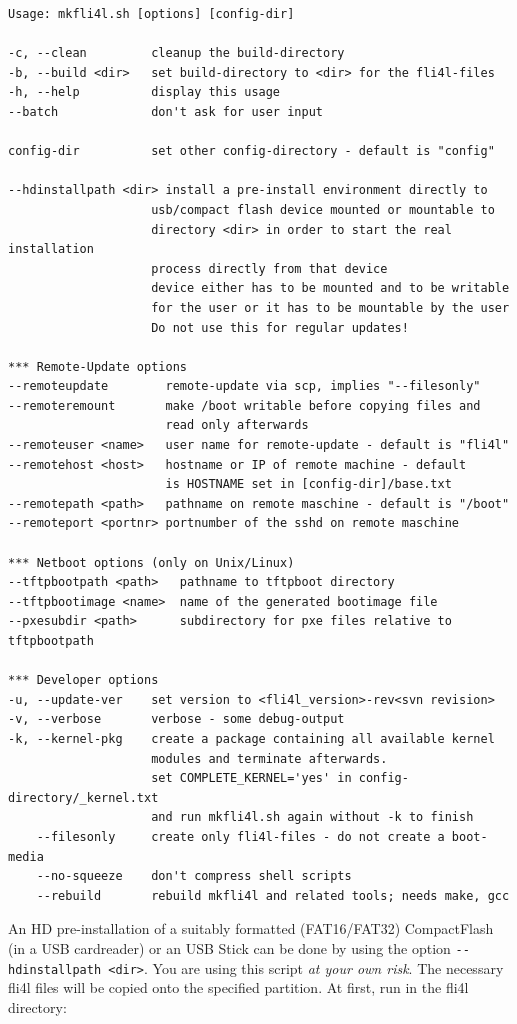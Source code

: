   \begin{verbatim}
Usage: mkfli4l.sh [options] [config-dir]

-c, --clean         cleanup the build-directory
-b, --build <dir>   set build-directory to <dir> for the fli4l-files
-h, --help          display this usage
--batch             don't ask for user input

config-dir          set other config-directory - default is "config"

--hdinstallpath <dir> install a pre-install environment directly to
                    usb/compact flash device mounted or mountable to
                    directory <dir> in order to start the real installation
                    process directly from that device
                    device either has to be mounted and to be writable
                    for the user or it has to be mountable by the user
                    Do not use this for regular updates!

*** Remote-Update options
--remoteupdate        remote-update via scp, implies "--filesonly"
--remoteremount       make /boot writable before copying files and
                      read only afterwards
--remoteuser <name>   user name for remote-update - default is "fli4l"
--remotehost <host>   hostname or IP of remote machine - default
                      is HOSTNAME set in [config-dir]/base.txt
--remotepath <path>   pathname on remote maschine - default is "/boot"
--remoteport <portnr> portnumber of the sshd on remote maschine

*** Netboot options (only on Unix/Linux)
--tftpbootpath <path>   pathname to tftpboot directory
--tftpbootimage <name>  name of the generated bootimage file
--pxesubdir <path>      subdirectory for pxe files relative to tftpbootpath

*** Developer options
-u, --update-ver    set version to <fli4l_version>-rev<svn revision>
-v, --verbose       verbose - some debug-output
-k, --kernel-pkg    create a package containing all available kernel
                    modules and terminate afterwards.
                    set COMPLETE_KERNEL='yes' in config-directory/_kernel.txt
                    and run mkfli4l.sh again without -k to finish
    --filesonly     create only fli4l-files - do not create a boot-media
    --no-squeeze    don't compress shell scripts
    --rebuild       rebuild mkfli4l and related tools; needs make, gcc

    \end{verbatim}

   An HD pre-installation of a suitably formatted (FAT16/FAT32) CompactFlash
   (in a USB cardreader) or an USB Stick can be done by using the option
   \verb+--hdinstallpath <dir>+.
   You are using this script \emph{at your own risk}.
   The necessary fli4l files will be copied onto the specified partition.
   At first, run in the fli4l directory:

